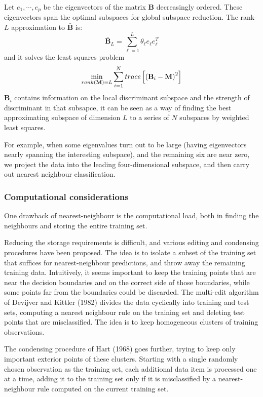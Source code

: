 \documentclass[12pt, letterpaper]{article}
\theoremstyle{definition}
\DeclarePairedDelimiter\autobracket{(}{)}
\newcommand{\br}[1]{\autobracket*{#1}}
\begin{document}
Let $e_1, \cdots, e_p$ be the eigenvectors  of the matrix $\mathbf{B}$ decreasingly ordered. These eigenvectors span the optimal subspaces for global subspace reduction. The rank-$L$ approximation to $\bar{\mathbf{B}}$ is:
\begin{equation}
\bar{\mathbf{B}}_L = \sum_{\ell=1}^L \theta_\ell e_\ell e_\ell^T
\end{equation}
and it solves the least squares problem
\begin{equation}
\min_{rank(\mathbf{M}) = L} \sum_{i=1}^N trace \left[ \br{\mathbf{B}_i - \mathbf{M}}^2\right]
\end{equation}
$\mathbf{B}_i$ contains information on the local discriminant subspace and the strength of discriminant in that subsapce, it can be seen as a way of finding the best approximating subspace of dimension $L$ to a series of $N$ subspaces by weighted least squares.

For example, when some eigenvalues turn out to be large (having eigenvectors nearly spanning the interesting subspace), and the remaining six are near zero,  we project the data into the leading four-dimensional subspace, and then carry out nearest neighbour classification.

\subsubsection{Computational considerations}
One drawback of nearest-neighbour is the computational load, both in finding the neighbours and storing the entire training set.

Reducing the storage requirements is difficult, and various editing and condensing procedures have been proposed. The idea is to isolate a subset of the training set that suffices for nearest-neighbour predictions, and throw away the remaining training data. Intuitively, it seems important to keep the training points that are near the decision boundaries and on the correct side of those boundaries, while some points far from the boundaries could be discarded.
The multi-edit algorithm of Devijver and Kittler (1982) divides the data cyclically into training and test sets, computing a nearest neighbour rule on the training set and deleting test points that are misclassified. The idea is to keep homogeneous clusters of training observations.

The condensing procedure of Hart (1968) goes further, trying to keep only important exterior points of these clusters. Starting with a single randomly chosen observation as the training set, each additional data item is processed one at a time, adding it to the training set only if it is misclassified by a nearest-neighbour rule computed on the current training set.
\end{document}

